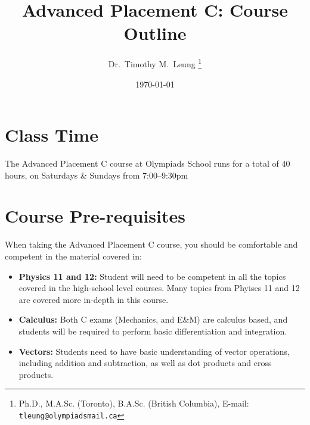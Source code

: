 \documentclass{../../oss-handout}
\title{Advanced Placement C: Course Outline}
\author{Dr.\ Timothy M.\ Leung
  \footnote{Ph.D., M.A.Sc. (Toronto), B.A.Sc. (British Columbia), E-mail:
    \texttt{tleung@olympiadsmail.ca}}
}
\date{\today}
\begin{document}
\thispagestyle{title}
\gentitle

\section*{Class Time}
The Advanced Placement C course at Olympiads School runs for a total of $40$
hours, on Saturdays \& Sundays from 7:00--9:30pm


\section*{Course Pre-requisites}
When taking the Advanced Placement C course, you should be comfortable and
competent in the material covered in:
\begin{itemize}[noitemsep,topsep=0pt,leftmargin=18pt]
\item\textbf{Physics 11 and 12:} Student will need to be competent in all the
  topics covered in the high-school level courses. Many topics from Phyiscs
  11 and 12 are covered more in-depth in this course.
\item\textbf{Calculus:} Both C exams (Mechanics, and E\&M) are calculus based,
  and students will be required to perform basic differentiation and
  integration.
\item\textbf{Vectors:} Students need to have basic understanding of vector
  operations, including addition and subtraction, as well as dot products and
  cross products.
\end{itemize}
\end{document}
